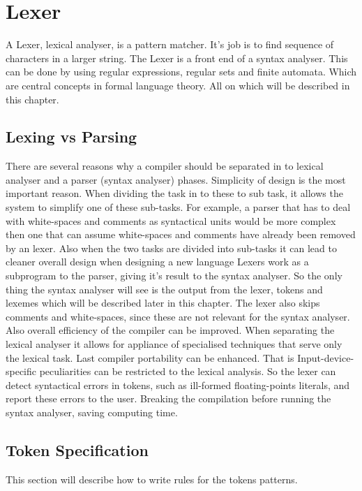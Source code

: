 \chapter{Lexer}
A Lexer, lexical analyser, is a pattern matcher. It's job is to find sequence 
of characters in a larger string. The Lexer is a front end of a syntax 
analyser. \cite{sebesta2012}
This can be done by using regular expressions, regular sets and finite
automata. Which are central concepts in formal language theory. \cite{Aho1990}
All on which will be described in this chapter.

\section{Lexing vs Parsing}
There are several reasons why a compiler should be separated in to lexical 
analyser and a parser (syntax analyser) phases. Simplicity of design is the most
important reason. When dividing the task in to these to sub task, it allows the
system to simplify one of these sub-tasks. For example, a parser that has to 
deal with white-spaces and comments as syntactical units would be more complex 
then one that can assume white-spaces and comments have already been removed by 
an lexer. Also when the two tasks are divided into sub-tasks it can lead to 
cleaner overall design when designing a new language \cite{Aho2006}
Lexers work as a subprogram to the parser, giving it's result to the syntax 
analyser. So the only thing the syntax analyser will see is the output from the 
lexer, tokens and lexemes which will be described later in this chapter. 
\cite{sebesta2012}
The lexer also skips comments and white-spaces, since these are not relevant 
for the syntax analyser. \cite{sebesta2012}
Also overall efficiency of the compiler can be improved. When separating the 
lexical analyser it allows for appliance of specialised techniques that serve 
only the lexical task. \cite{Aho2006}
Last compiler portability can be enhanced. That is Input-device-specific 
peculiarities can be restricted to the lexical analysis. \cite{Aho2006}
So the lexer can detect syntactical errors in tokens, such as ill-formed 
floating-points literals, and report these errors to the user. 
\cite{sebesta2012} Breaking the compilation before running the syntax analyser, 
saving computing time. 
\sectionbreak
\section{Token Specification}
This section will describe how to write rules for the tokens patterns. 
